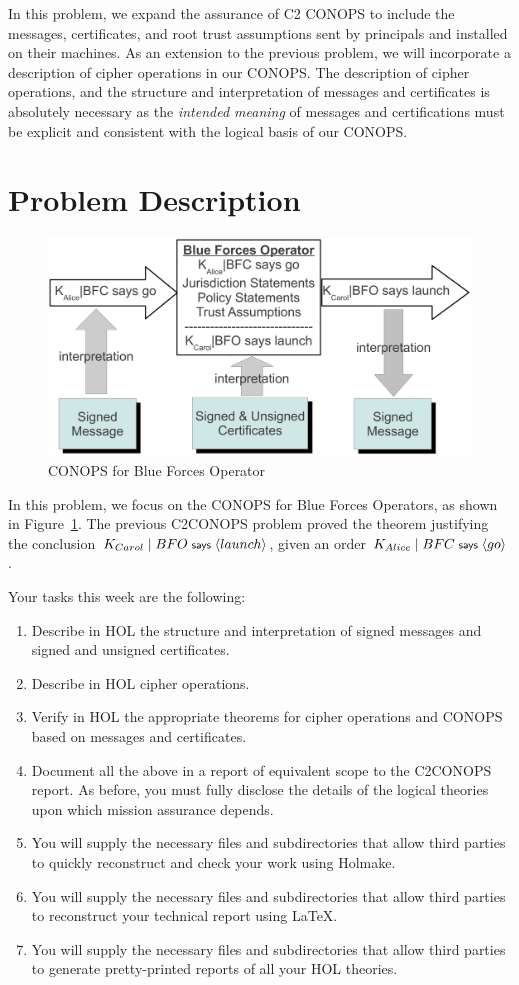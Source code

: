 \documentclass[10pt,twoside]{article}
\newcommand{\action}[1]{\ensuremath{\langle #1 \rangle}}
\begin{document}
In this problem, we expand the assurance of C2 CONOPS to include the
messages, certificates, and root trust assumptions sent by principals
and installed on their machines. As an extension to the previous
problem, we will incorporate a description of cipher operations in our
CONOPS. The description of cipher operations, and the structure and
interpretation of messages and certificates is absolutely necessary as
the \emph{intended meaning} of messages and certifications must be
explicit and consistent with the logical basis of our CONOPS.

\section{Problem Description}
\label{sec:problem-description}

\begin{figure}[t]
  \centering
  \includegraphics[width=0.6\linewidth]{Figures/messageCONOPS}
  \caption{CONOPS for Blue Forces Operator}
  \label{fig:BFO-CONOPS}
\end{figure}

In this problem, we focus on the CONOPS for Blue Forces Operators, as
shown in Figure~\ref{fig:BFO-CONOPS}. The previous C2CONOPS problem
proved the theorem justifying the conclusion $K_{Carol} \quoting BFO
\says \action{launch}$, given an order $K_{Alice} \quoting BFC \says
\action{go}$.

Your tasks this week are the following:
\begin{enumerate}
\item Describe in HOL the structure and interpretation of signed
  messages and signed and unsigned certificates.
\item Describe in HOL cipher operations.
\item Verify in HOL the appropriate theorems for cipher operations and
  CONOPS based on messages and certificates.
\item Document all the above in a report of equivalent scope to the
  C2CONOPS report.  As before, you must fully disclose the details of
  the logical theories upon which mission assurance depends.
\item You will supply the necessary files and subdirectories that
  allow third parties to quickly reconstruct and check your work using
  Holmake.
\item You will supply the necessary files and subdirectories that
  allow third parties to reconstruct your technical report using
  \LaTeX{}.
\item You will supply the necessary files and subdirectories that
  allow third parties to generate pretty-printed reports of all your
  HOL theories.
\end{enumerate}
\end{document}
